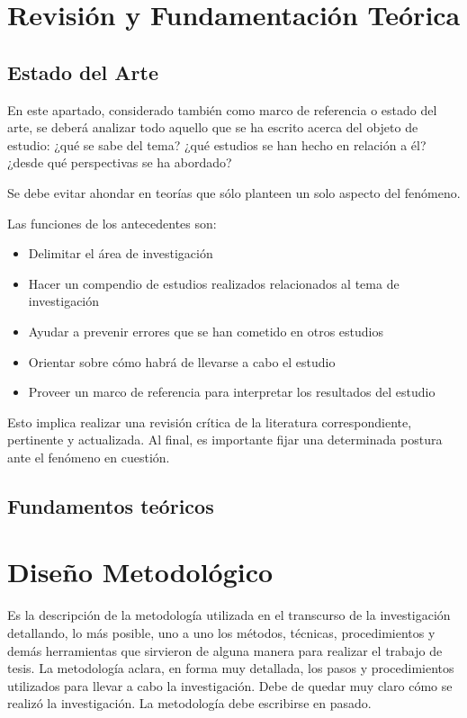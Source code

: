 \documentclass[12]{plan_tesis}
\begin{document}
\chapter{Revisión y Fundamentación Teórica}

\section{Estado del Arte}
En este apartado, considerado también como marco de referencia o estado del arte, se deberá analizar todo aquello que se ha escrito acerca del objeto de estudio: ¿qué se sabe del tema? ¿qué estudios se han hecho en relación a él? ¿desde qué perspectivas se ha abordado?\newline

Se debe evitar ahondar en teorías que sólo planteen un solo aspecto del fenómeno.\newline

Las funciones de los antecedentes son:

\begin{itemize}
    \item Delimitar el área de investigación
    \item Hacer un compendio de estudios realizados relacionados al tema de investigación
    \item Ayudar a prevenir errores que se han cometido en otros estudios
    \item Orientar sobre cómo habrá de llevarse a cabo el estudio
    \item Proveer un marco de referencia para interpretar los resultados del estudio
\end{itemize}

Esto implica realizar una revisión crítica de la literatura correspondiente, pertinente y actualizada. Al final, es importante fijar una determinada postura ante el fenómeno en cuestión.

\section{Fundamentos teóricos}


\chapter{Diseño Metodológico}

Es la descripción de la metodología utilizada en el transcurso de la investigación detallando, lo más posible, uno a uno los métodos, técnicas, procedimientos y demás herramientas que sirvieron de alguna manera para realizar el trabajo de tesis. 
La metodología aclara, en forma muy detallada, los pasos y procedimientos utilizados para llevar a cabo la investigación. Debe de quedar muy claro cómo se realizó la investigación. La metodología debe escribirse en pasado.
\end{document}
